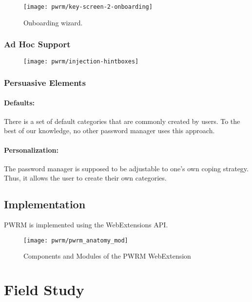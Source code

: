 \begin{figure}[htbp]
	\centering
	\texttt{[image: pwrm/key-screen-2-onboarding]}
	\caption{\label{fig:pwrm:key-screen-onboarding} Onboarding wizard.}
\end{figure}


\subsubsection{Ad Hoc Support}

\begin{figure}[htbp]
	\centering
	\texttt{[image: pwrm/injection-hintboxes]}
	\caption{\label{fig:pwrm:injection-hintboxes} }
\end{figure}


\subsubsection{Persuasive Elements}
\paragraph{Defaults:} There is a set of default categories that are commonly created by users. To the best of our knowledge, no other password manager uses this approach.


\paragraph{Personalization:} The password manager is supposed to be adjustable to one's own coping strategy. Thus, it allows the user to create their own categories. 




\subsection{Implementation}
PWRM is implemented using the WebExtensions API. 
\begin{figure}[htbp]
	\centering
	\texttt{[image: pwrm/pwrm\_anatomy\_mod]}
	\caption{\label{fig:pwrm:components} Components and Modules of the PWRM WebExtension}
\end{figure}


\section{Field Study}\label{sec:pwrm:field_study}


